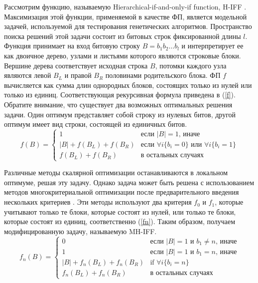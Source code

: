 Рассмотрим функцию, называемую Hierarchical-if-and-only-if function, H-IFF \cite{h-iff, mh-iff}. Максимизация этой функции, применяемой в качестве ФП, является модельной задачей, используемой для тестирования генетических алгоритмов. Пространство поиска решений этой задачи состоит из битовых строк фиксированной длины $l$. Функция принимает на вход битовую строку $B = b_1b_2\ldots b_l$ и интерпретирует ее как двоичное дерево, узлами и листьями которого являются строковые блоки. Вершине дерева соответствует исходная строка $B$, потомки каждого узла являются левой $B_L$ и правой $B_R$ половинами родительского блока. ФП $f$ вычисляется как сумма длин однородных блоков, состоящих только из нулей или только из единиц. Соответствующая рекурсивная формула приведена в (\ref{f}). Обратите внимание, что существует два возможных оптимальных решения задачи. Один оптимум представляет собой строку из нулевых битов, другой оптимум имеет вид строки, состоящей из единичных битов. 
\begin{equation}
\label{f}
      f(B) =
      \begin{cases}
       1 & \text{если } |B| = 1\text{, иначе}\\
       |B| + f(B_L) + f(B_R) & \text{если } \forall i \{b_i = 0\}\text{ или }\forall i \{b_i = 1\}\\
       f(B_L) + f(B_R) & \text{в остальных случаях}
      \end{cases}
\end{equation}

Различные методы скалярной оптимизации останавливаются в локальном оптимуме, решая эту задачу. Однако задача может быть решена с использованием методов многокритериальной оптимизации после предварительного введения нескольких критериев \cite{mh-iff}. Эти методы используют два критерия $f_0$ и $f_1$, которые учитывают только те блоки, которые состоят из нулей, или только те блоки, которые состоят из единиц, соответственно (\ref{fn}). Таким образом, получаем модифицированную задачу, называемую MH-IFF.
\begin{equation}
\label{fn}
      f_n(B) =
      \begin{cases}
       0 & \text{если } |B| = 1\text{ и }b_1 \neq n\text{, иначе}\\
       1 & \text{если } |B| = 1\text{ и }b_1 = n\text{, иначе}\\
       |B| + f_n(B_L) + f_n(B_R) & \text{if } \forall i \{b_i = n\}\\
       f_n(B_L) + f_n(B_R) & \text{в остальных случаях}
      \end{cases}
\end{equation}

